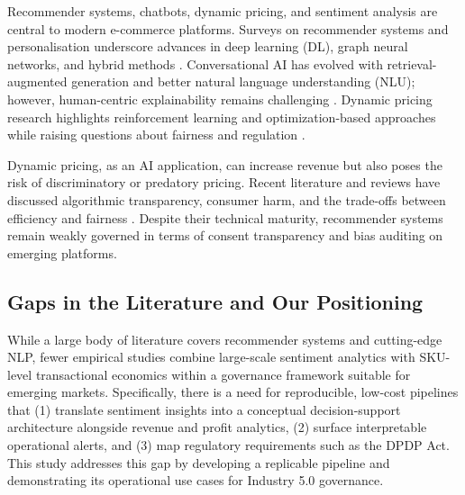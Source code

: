 \documentclass[authoryear,review,3p,times,12pt]{elsarticle}
\begin{document}
Recommender systems, chatbots, dynamic pricing, and sentiment analysis are central to modern e-commerce platforms. Surveys on recommender systems and personalisation underscore advances in deep learning (DL), graph neural networks, and hybrid methods \citep{Zhou132011378, He31122025}. Conversational AI has evolved with retrieval-augmented generation and better natural language understanding (NLU); however, human-centric explainability remains challenging \citep{alshehri2025towards}. Dynamic pricing research highlights reinforcement learning and optimization-based approaches while raising questions about fairness and regulation \citep{Chenavaz31122025}. 

Dynamic pricing, as an AI application, can increase revenue but also poses the risk of discriminatory or predatory pricing. Recent literature and reviews have discussed algorithmic transparency, consumer harm, and the trade-offs between efficiency and fairness \citep{Chenavaz31122025,Nowak142411668}. Despite their technical maturity, recommender systems remain weakly governed in terms of consent transparency and bias auditing on emerging platforms.

\subsection{Gaps in the Literature and Our Positioning}
While a large body of literature covers recommender systems and cutting-edge NLP, fewer empirical studies combine large-scale sentiment analytics with SKU-level transactional economics within a governance framework suitable for emerging markets. Specifically, there is a need for reproducible, low-cost pipelines that (1) translate sentiment insights into a conceptual decision-support architecture alongside revenue and profit analytics, (2) surface interpretable operational alerts, and (3) map regulatory requirements such as the DPDP Act. This study addresses this gap by developing a replicable pipeline and demonstrating its operational use cases for Industry 5.0 governance. 
\end{document}
